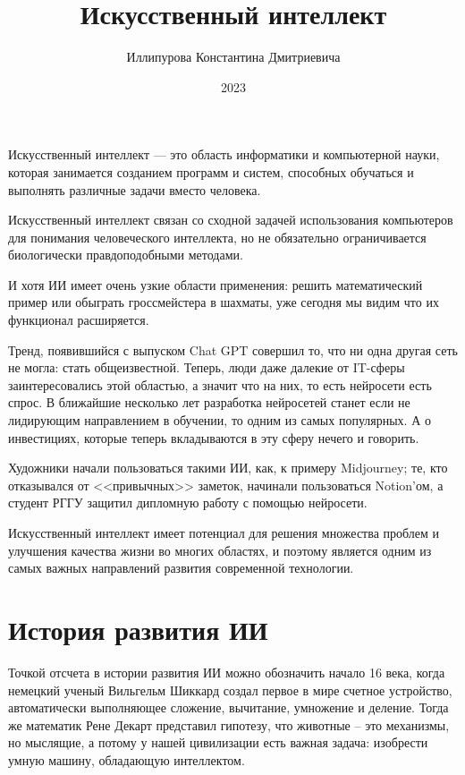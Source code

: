 \documentclass[bachelor,och,referat]{SCWorks_corrected}
\begin{document}
\title{Искусственный интеллект}
\author{Иллипурова Константина Дмитриевича}
\date{2023}

\maketitle
\tableofcontents

\intro

Искусственный интеллект --- это область информатики и компьютерной науки, которая занимается созданием программ и систем, способных обучаться и выполнять различные задачи вместо человека.\cite{N1}

Искусственный интеллект связан со сходной задачей использования компьютеров для понимания человеческого интеллекта, но не обязательно ограничивается биологически правдоподобными методами.

И хотя ИИ имеет очень узкие области применения: решить математический пример или обыграть гроссмейстера в шахматы, уже сегодня мы видим что их функционал расширяется.

Тренд, появившийся с выпуском Chat GPT совершил то, что ни одна другая сеть не могла: стать общеизвестной. Теперь, люди даже далекие от IT-сферы заинтересовались этой областью, а значит что на них, то есть нейросети есть спрос. В ближайшие несколько лет разработка нейросетей станет если не лидирующим направлением в обучении, то одним из самых популярных. А о инвестициях, которые теперь вкладываются в эту сферу нечего и говорить.

Художники начали пользоваться такими ИИ, как, к примеру Midjourney; те, кто отказывался от <<привычных>> заметок, начинали пользоваться Notion'ом, а студент РГГУ защитил дипломную работу с помощью нейросети.\cite{N7}

Искусственный интеллект имеет потенциал для решения множества проблем и улучшения качества жизни во многих областях, и поэтому является одним из самых важных направлений развития современной технологии.

\section{История развития ИИ}

Точкой отсчета в истории развития ИИ можно обозначить начало 16 века, когда немецкий ученый Вильгельм Шиккард создал первое в мире счетное устройство, автоматически выполняющее сложение, вычитание, умножение и деление. Тогда же математик Рене Декарт представил гипотезу, что животные – это механизмы, но мыслящие, а потому у нашей цивилизации есть важная задача: изобрести умную машину, обладающую интеллектом.\cite{N11}
\end{document}
